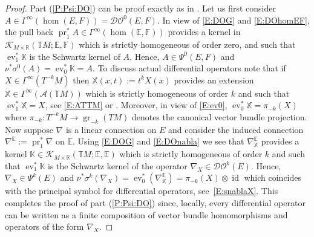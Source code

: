 \documentclass[reqno,12pt]{amsart}
\DeclareMathOperator{\pr}{pr}
\DeclareMathOperator{\gr}{gr}
\DeclareMathOperator{\ev}{ev}
\DeclareMathOperator{\id}{id}
\newcommand{\DO}{\mathcal D\mathcal O}
\newcommand\R{\mathbb R}
\newcommand\itemref[1]{(\ref{#1})}
\theoremstyle{plain}
\theoremstyle{definition}
\begin{document}
\begin{proof}
Part \itemref{P:Psi:DO} can be proof exactly as in \cite[Section~7.3]{EY15}.
Let us first consider $A\in\Gamma^\infty(\hom(E,F))=\DO^0(E,F)$.
In view of \eqref{E:DOG} and \eqref{E:DOhomEF}, the pull back $\pr_1^*A\in\Gamma^\infty(\hom(\mathbb E,\mathbb F))$ provides a kernel in $\mathcal K_{M\times\R}(\mathbb TM;\mathbb E,\mathbb F)$ which is strictly homogeneous of order zero, and such that $\ev_1^*\mathbb K$ is the Schwartz kernel of $A$.
Hence, $A\in\Psi^0(E,F)$ and $\nu^*\sigma^0(A)=\ev_0^*\mathbb K=A$.
To discuss actual differential operators note that if $X\in\Gamma^\infty(T^{-k}M)$ then $\mathbb X(x,t):=t^kX(x)$ provides an extension $\mathbb X\in\Gamma^\infty(\mathcal A(\mathbb TM))$ which is strictly homogeneous of order $k$ and such that $\ev_1^*\mathbb X=X$, see \eqref{E:ATTM} or \cite[Section~7.3]{EY15}.
Moreover, in view of \eqref{E:ev0}, $\ev_0^*\mathbb X=\pi_{-k}(X)$ where $\pi_{-k}\colon T^{-k}M\to\gr_{-k}(TM)$ denotes the canonical vector bundle projection.
Now suppose $\nabla$ is a linear connection on $E$ and consider the induced connection $\nabla^{\mathbb E}:=\pr_1^*\nabla$ on $\mathbb E$.
Using \eqref{E:DOG} and \eqref{E:DOnabla} we see that $\nabla^{\mathbb E}_{\mathbb X}$ provides a kernel $\mathbb K\in\mathcal K_{M\times\R}(\mathbb TM;\mathbb E,\mathbb E)$ which is strictly homogeneous of order $k$ and such that $\ev_1^*\mathbb K$ is the Schwartz kernel of the operator $\nabla_X\in\DO^k(E)$.
Hence, $\nabla_X\in\Psi^k(E)$ and $\nu^*\sigma^k(\nabla_X)=\ev_0^*(\nabla^{\mathbb E}_{\mathbb X})=\pi_{-k}(X)\otimes\id$ which coincides with the principal symbol for differential operators, see~\eqref{E:snablaX}.
This completes the proof of part \itemref{P:Psi:DO} since, locally, every differential operator can be written as a finite composition of vector bundle homomorphisms and operators of the form $\nabla_X$.



\end{proof}
\end{document}

